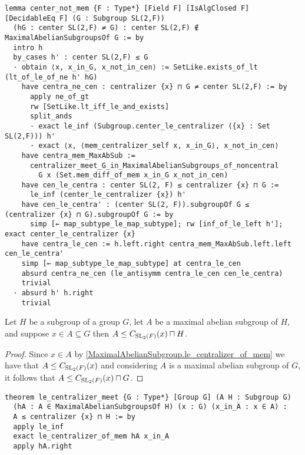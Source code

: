 \begin{footnotesize}
\begin{verbatim}
lemma center_not_mem {F : Type*} [Field F] [IsAlgClosed F] [DecidableEq F] (G : Subgroup SL(2,F))
  (hG : center SL(2,F) ≠ G) : center SL(2,F) ∉ MaximalAbelianSubgroupsOf G := by
  intro h
  by_cases h' : center SL(2,F) ≤ G
  · obtain ⟨x, x_in_G, x_not_in_cen⟩ := SetLike.exists_of_lt (lt_of_le_of_ne h' hG)
    have centra_ne_cen : centralizer {x} ⊓ G ≠ center SL(2,F) := by
      apply ne_of_gt
      rw [SetLike.lt_iff_le_and_exists]
      split_ands
      · exact le_inf (Subgroup.center_le_centralizer ({x} : Set SL(2,F))) h'
      · exact ⟨x, ⟨mem_centralizer_self x, x_in_G⟩, x_not_in_cen⟩
    have centra_mem_MaxAbSub :=
      centralizer_meet_G_in_MaximalAbelianSubgroups_of_noncentral
        G x (Set.mem_diff_of_mem x_in_G x_not_in_cen)
    have cen_le_centra : center SL(2, F) ≤ centralizer {x} ⊓ G :=
      le_inf (center_le_centralizer {x}) h'
    have cen_le_centra' : (center SL(2, F)).subgroupOf G ≤ (centralizer {x} ⊓ G).subgroupOf G := by
      simp [← map_subtype_le_map_subtype]; rw [inf_of_le_left h']; exact center_le_centralizer {x}
    have centra_le_cen := h.left.right centra_mem_MaxAbSub.left.left cen_le_centra'
    simp [← map_subtype_le_map_subtype] at centra_le_cen
    absurd centra_ne_cen (le_antisymm centra_le_cen cen_le_centra)
    trivial
  · absurd h' h.right
    trivial
\end{verbatim}
\end{footnotesize}



\begin{lemma}
  \label{MaximalAbelianSubgroup.le_centralizer_meet}
  \leanok
  Let $H$ be a subgroup of a group $G$, let $A$ be a maximal abelian subgroup of $H$, and suppose $x \in A \subseteq G$ then 
  $A \le C_{\operatorname{SL}_2(F)}(x) \sqcap H$.
\end{lemma}
\begin{proof}
  \leanok

  Since $x \in A$ by \ref{MaximalAbelianSubgroup.le_centralizer_of_mem} we have that $A \le C_{\operatorname{SL}_2(F)}(x)$ and considering
  $A$ is a maximal abelian subgroup of $G$, it follows that $A \le C_{\operatorname{SL}_2(F)}(x) \sqcap G$.
\end{proof}
\begin{footnotesize}
\begin{verbatim}
theorem le_centralizer_meet {G : Type*} [Group G] (A H : Subgroup G)
  (hA : A ∈ MaximalAbelianSubgroupsOf H) (x : G) (x_in_A : x ∈ A) :
  A ≤ centralizer {x} ⊓ H := by
  apply le_inf
  exact le_centralizer_of_mem hA x_in_A
  apply hA.right
\end{verbatim}
\end{footnotesize}

